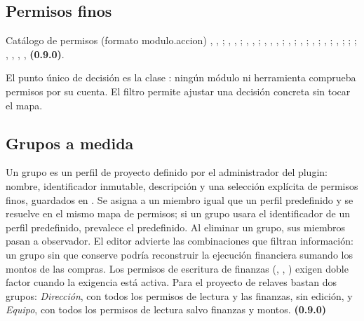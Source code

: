 \documentclass[11pt,a4paper]{article}
\begin{document}
\subsection{Permisos finos}

\begin{caja}{Catálogo de permisos (formato modulo.accion)}
, , ;
, , ;
, , ;
, , , ;
, ;
, ;
, ;
, ;
, ;
;
;
, , , ,  \textbf{(0.9.0)}.
\end{caja}

El punto único de decisión es la clase : ningún módulo ni herramienta comprueba permisos por su cuenta. El filtro  permite ajustar una decisión concreta sin tocar el mapa.

\subsection{Grupos a medida}

Un grupo es un perfil de proyecto definido por el administrador del plugin: nombre, identificador inmutable, descripción y una selección explícita de permisos finos, guardados en . Se asigna a un miembro igual que un perfil predefinido y se resuelve en el mismo mapa de permisos; si un grupo usara el identificador de un perfil predefinido, prevalece el predefinido. Al eliminar un grupo, sus miembros pasan a observador. El editor advierte las combinaciones que filtran información: un grupo sin  que conserve  podría reconstruir la ejecución financiera sumando los montos de las compras. Los permisos de escritura de finanzas (, , ) exigen doble factor cuando la exigencia está activa. Para el proyecto de relaves bastan dos grupos: \emph{Dirección}, con todos los permisos de lectura y las finanzas, sin edición, y \emph{Equipo}, con todos los permisos de lectura salvo finanzas y montos. \textbf{(0.9.0)}
\end{document}
